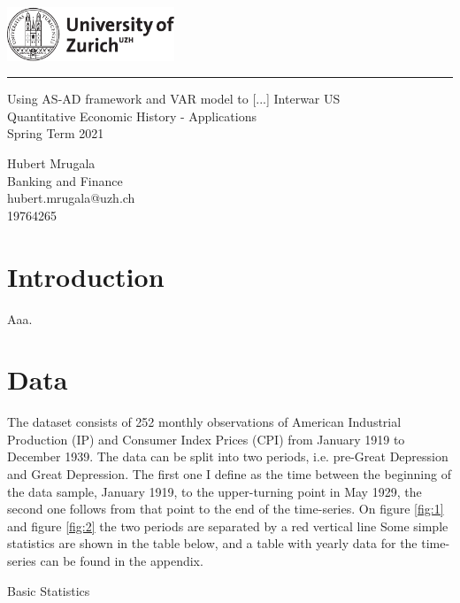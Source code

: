 \documentclass[a4paper,12pt]{article}
\begin{document}
\begin{titlepage}
\noindent\includegraphics[width=5cm]{uzh_logo_e_pos.pdf}
\noindent\rule{\textwidth}{0.4pt}
\vspace{1cm}
  \begin{center}
		{\LARGE Using AS-AD framework and VAR model to [...] Interwar US} \\
		{\Large Quantitative Economic History - Applications\\Spring Term 2021}
  \end{center}
\vfill

{\flushleft
Hubert Mrugala \\
Banking and Finance\\
hubert.mrugala@uzh.ch\\
19764265}  

\end{titlepage}

\pagebreak
\pagebreak

\section{Introduction}

Aaa.
\newpage

\section{Data}

The dataset consists of 252 monthly observations of American Industrial Production (IP) and Consumer Index Prices (CPI) from January 1919 to December 1939. The data can be split into two periods, i.e. pre-Great Depression and Great Depression. The first one I define as the time between the beginning of the data sample, January 1919, to the upper-turning point in May 1929, the second one follows from that point to the end of the time-series. On figure \ref{fig:1} and figure \ref{fig:2} the two periods are separated by a red vertical line Some simple statistics are shown in the table below, and a table with yearly data for the time-series can be found in the appendix. 

\begin{table}[h]
\label{table:1}
\caption{Basic Statistics}
\centering

\end{table}
\end{document}
